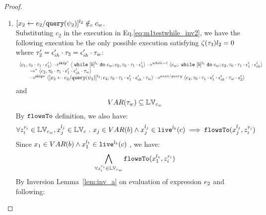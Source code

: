 \begin{proof}
\begin{case}[$\trace_2 = \trace_{ih} \cdot \event_{ih}$]
\begin{subcase}
\begin{subsubcase}
\begin{subproof}
\begin{enumerate}
  By uniqueness of the program label, there must exist another while command in $c_2$, -- i.e., $\ewhile [b_2]^{l_{b2}} \edo c_{w2} \in_c c_2$ --
    such that 
  $\ewhile [b]^{l_b} \edo c_w \in c_{w2}$ and $[\assign{{x}_2}{\expr_2 / \query(\qexpr_2)}]^{l_2} \in_c c_w$, i.e.,:
  \[
  \exists b_2, l_{b2} \in \mathbb{N}, c_{w2} \st 
  \ewhile [b_2]^{l_{b2}} \edo c_{w2} \in_c c_2 
  \land \ewhile [b]^{l_b} \edo c_w \in c_{w2}
  \land [\assign{{x}_2}{\expr_2 / \query(\qexpr_2)}]^{l_2} \in_c c_w
  \]
%
Then we know there exists $c_5$ and $c_6$ such that:
\[
  c_2 =_c c_5; \ewhile [b_2]^{l_{b2}} \edo c_{w2};c_6
\]
Which is contradict to $c_2 =_c [\eskip^*];[\assign{{x}_2}{\expr_2 / \query(\qexpr_2)}]^{l_2};{c}_4$ by program equality definition.
%
%
 \item $[\mathrel{ {x}_2 \leftarrow e_2 / {\tt query}(\psi_2) }]^{l_2} \notin_c c_w$.
%
\\
%
Substituting $c_2$ in the execution in Eq.\ref{eq:m1testwhile_inv2}, we have the following execution be the only possible execution satisfying $\mathtt{\zeta}(\mathtt{\tau}_3) l_2 = 0$ where $\mathtt{\tau}_2' = \mathtt{\epsilon}_{ih}' \cdot \mathtt{\tau}_3 = \mathtt{\epsilon}_{ih}' \cdot \mathtt{\tau}_w$:
\[
    \begin{array}{l}   
  \langle c_1, \mathtt{\tau}_0 \cdot \mathtt{\tau}_1 \cdot \mathtt{\epsilon}_1' \rangle 
  \rightarrow^{\mathtt{skip}^*} 
  \langle \;\mathtt{while}\; [b]^{l_b} \;\mathtt{do}\; c_w;{c}_2, \mathtt{\tau}_0 \cdot \mathtt{\tau}_1 \cdot \mathtt{\epsilon}_1' \rangle 
  \rightarrow^{while-t} 
  \langle c_w;\;\mathtt{while}\; [b]^{l_b} \;\mathtt{do}\; c_w;c_2, \mathtt{\tau}_0 \cdot \mathtt{\tau}_1 \cdot \mathtt{\epsilon}_1' \cdot \mathtt{\epsilon}_{ih}' \rangle 
  \\
  \qquad \rightarrow^{*} 
  \langle c_2,\mathtt{\tau}_0 \cdot \mathtt{\tau}_1 \cdot \mathtt{\epsilon}_1' \cdot \mathtt{\epsilon}_{ih}' \cdot \mathtt{\tau}_w \rangle
  \\
  \qquad \rightarrow^{\mathtt{skip}*} 
  \langle [\mathrel{ {x}_2 \leftarrow e_2 / {\tt query}(\psi_2) }]^{l_2};{c}_4, 
  \mathtt{\tau}_0 \cdot \mathtt{\tau}_1 \cdot \mathtt{\epsilon}_1' \cdot \mathtt{\epsilon}_{ih}' \cdot \mathtt{\tau}_w \rangle
  \rightarrow^{assn/query} 
  \langle {c}_4,  \mathtt{\tau}_0 \cdot \mathtt{\tau}_1 \cdot \mathtt{\epsilon}_1' \cdot \mathtt{\epsilon}_{ih}' \cdot \mathtt{\tau}_w \cdot \mathtt{\epsilon}_2' \rangle 
\end{array}
\]
and
\[
  VAR{(\mathtt{\tau}_w)} \subseteq \mathbb{LV}_{c_w}
\]
%
By $\mathtt{flowsTo}$ definition, we also have:
\[
  \forall z_i^{r_i} \in \mathbb{LV}_{c_w},  x_j^{l_j} \in \mathbb{LV}_c ~.~ x_j \in VAR(b) \land x_j^{l_j} \in \mathtt{live}^{l_b}(c) \implies
  \mathtt{flowsTo}(x_j^{l_j}, z_i^{r_i})
\]
Since $x_1 \in VAR(b) \land x_1^{l_1} \in \mathtt{live}^{l_b}(c)$ , we have:
\[
  \bigwedge_{\forall z_i^{r_i} \in \mathbb{LV}_{c_w}}
  \mathtt{flowsTo}(x_1^{l_1}, z_i^{r_i})
\]
%
By Inversion Lemma~\ref{lem:inv_a} on evaluation of expression $e_2$ and following: 

\end{enumerate}
\end{subproof}
\end{subsubcase}
\end{subcase}
\end{case}
\end{proof}
